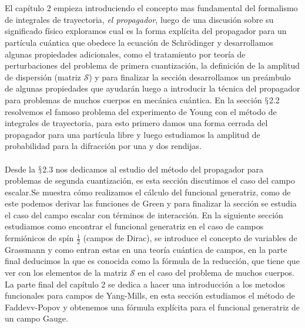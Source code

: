 \\
\\
El capítulo 2 empieza introduciendo el concepto mas fundamental del formalismo de integrales de trayectoria, \textit{el propagador}, luego de una discusión sobre su significado físico exploramos cual es la forma explícita del propagador para un partícula cuántica que obedece la ecuación de Schrödinger y desarrollamos algunas propiedades adicionales, como el tratamiento por teoría de perturbaciones del problema de primera cuantización, la definición de la amplitud de dispersión (matriz $\mathcal{S}$) y para finalizar la sección desarrollamos un preámbulo de algunas propiedades que ayudarán luego a introducir la técnica del propagador para problemas de muchos cuerpos en mecánica cuántica. En la sección  $\mathsection$2.2 resolvemos el famoso problema del experimento de Young con el método de integrales de trayectoria, para esto primero damos una forma cerrada del propagador para una partícula libre y luego estudiamos la amplitud de probabilidad para la difracción por una y dos rendijas.
\\
\\
Desde la  $\mathsection$2.3 nos dedicamos al estudio del método del propagador para problemas de segunda cuantización, es esta sección discutimos el caso del campo escalar.Se muestra cómo realizamos el cálculo del funcional generatriz, como de este podemos derivar las funciones de Green y para finalizar la sección se estudia el caso del campo escalar con términos de interacción. En la siguiente sección estudiamos como encontrar el funcional generatriz en el caso de campos fermiónicos de spín $\frac{1}{2}$ (campos de Dirac), se introduce el concepto de variables de Grassmann y como entran estas en una teoría cuántica de campos, en la parte final deducimos la que es conocida como la fórmula de la reducción, que tiene que ver con los elementos de la matriz $\mathcal{S}$ en el caso del problema de muchos cuerpos. La parte final del capítulo 2 se dedica a hacer una introducción a los metodos funcionales para campos de Yang-Mills, en esta sección estudiamos el método de Faddevv-Popov y obtenemos una fórmula explícita para el funcional generatriz de un campo Gauge.
\\
\\
